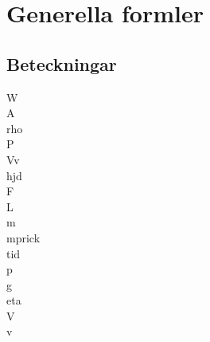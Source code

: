 \chapter{Generella formler}
\section*{Beteckningar}

\acrfull{W}\\
\acrfull{A}\\
\acrfull{rho}\\
\acrfull{P}\\
\acrfull{Vv}\\
\acrfull{hjd}\\
\acrfull{F}\\
\acrfull{L}\\
\acrfull{m}\\
\acrfull{mprick}\\
\acrfull{tid}\\
\acrfull{p}\\
\acrfull{g}\\
\acrfull{eta}\\
\acrfull{V}\\
\acrfull{v}

